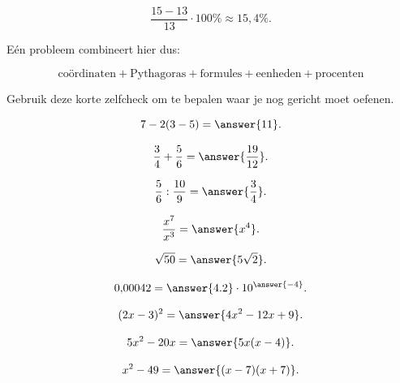 \documentclass{ximera}
\begin{document}
\[
\frac{15-13}{13}\cdot100\%
\approx15{,}4\%.
\]

Eén probleem combineert hier dus:

\[
\boxed{
\text{coördinaten}
+
\text{Pythagoras}
+
\text{formules}
+
\text{eenheden}
+
\text{procenten}
}
\]



Gebruik deze korte zelfcheck om te bepalen waar je nog gericht moet oefenen.

\begin{oefening}{\oefB\ESS}

\begin{question}
\[
7-2(3-5)=\answer{11}.
\]
\end{question}

\begin{question}
\[
\frac34+\frac56=\answer{\frac{19}{12}}.
\]
\end{question}

\begin{question}
\[
\frac56:\frac{10}{9}=\answer{\frac34}.
\]
\end{question}

\end{oefening}


\begin{oefening}{\oefB\ESS}

\begin{question}
\[
\frac{x^7}{x^3}=\answer{x^4}.
\]
\end{question}

\begin{question}
\[
\sqrt{50}=\answer{5\sqrt2}.
\]
\end{question}

\begin{question}
\[
0{,}00042
=
\answer{4.2}\cdot10^{\answer{-4}}.
\]
\end{question}

\end{oefening}


\begin{oefening}{\oefB\ESS}

\begin{question}
\[
(2x-3)^2
=
\answer{4x^2-12x+9}.
\]
\end{question}

\begin{question}
\[
5x^2-20x
=
\answer{5x(x-4)}.
\]
\end{question}

\begin{question}
\[
x^2-49
=
\answer{(x-7)(x+7)}.
\]
\end{question}

\end{oefening}
\end{document}

